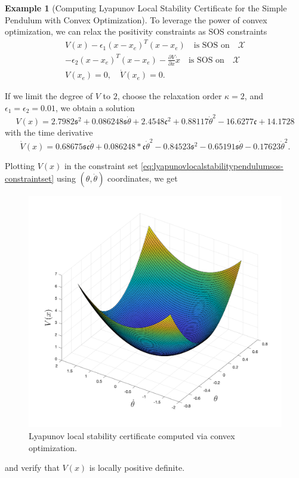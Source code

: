 \documentclass[
]{book}
\theoremstyle{definition}
\theoremstyle{definition}
\newtheorem{example}{Example}[chapter]
\theoremstyle{definition}
\theoremstyle{definition}
\theoremstyle{remark}
\begin{document}
\begin{example}[Computing Lyapunov Local Stability Certificate for the Simple Pendulum with Convex Optimization]
To leverage the power of convex optimization, we can relax the positivity constraints as SOS constraints
\begin{align}
V(x) - \epsilon_1 (x - x_e)^T (x - x_e) \quad \text{is SOS on} \quad \mathcal{X} \\
- \epsilon_2 (x - x_e)^T (x - x_e) - \frac{\partial V}{\partial x} \dot{x}\quad \text{is SOS on} \quad \mathcal{X} \\
V(x_e) = 0, \quad \dot{V}(x_e) = 0.
\end{align}

If we limit the degree of \(V\) to \(2\), choose the relaxation order \(\kappa = 2\), and \(\epsilon_1 = \epsilon_2 = 0.01\), we obtain a solution
\[
V(x) = 2.7982 \mathfrak{s}^2 + 0.086248 \mathfrak{s} \dot{\theta} + 2.4548\mathfrak{c}^2 + 0.88117 \dot{\theta}^2 - 16.6277 \mathfrak{c} + 14.1728
\]
with the time derivative
\[
\dot{V}(x) = 0.68675 \mathfrak{s} \mathfrak{c} \dot{\theta} + 0.086248* \mathfrak{c} \dot{\theta}^2 - 0.84523 \mathfrak{s}^2 - 0.65191 \mathfrak{s} \dot{\theta} - 0.17623 \dot{\theta}^2.
\]

Plotting \(V(x)\) in the constraint set \eqref{eq:lyapunovlocalstabilitypendulumsos-constraintset} using \((\theta, \dot{\theta})\) coordinates, we get

\begin{figure}

{\centering \includegraphics[width=0.6\linewidth]{images/pendulum-local-lyapunov-certificate-V} 

}

\caption{Lyapunov local stability certificate computed via convex optimization.}\label{fig:lyapunov-local-certificate-pendulum-V}
\end{figure}

and verify that \(V(x)\) is locally positive definite.


\end{example}
\end{document}
